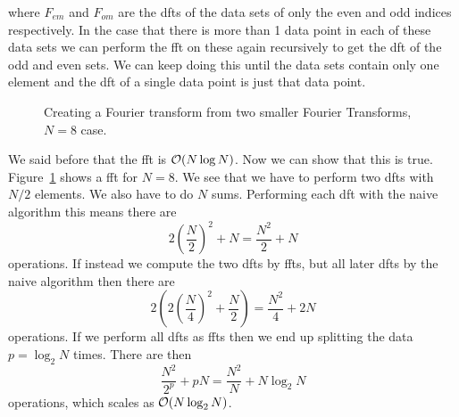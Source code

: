 \documentclass[a4paper]{article}
\begin{document}
    where \(F_{em}\) and \(F_{om}\) are the \glspl{dft} of the data sets of only the even and odd indices respectively.
    In the case that there is more than 1 data point in each of these data sets we can perform the \gls{fft} on these again recursively to get the \gls{dft} of the odd and even sets.
    We can keep doing this until the data sets contain only one element and the \gls{dft} of a single data point is just that data point.
    \begin{figure}[ht]
        \centering
        \caption{Creating a Fourier transform from two smaller Fourier Transforms, \(N = 8\) case.}
        \label{fig:fft example}
    \end{figure}
    We said before that the \gls{fft} is \(\order{N\log N}\).
    Now we can show that this is true.
    Figure~\ref{fig:fft example} shows a \gls{fft} for \(N = 8\).
    We see that we have to perform two \glspl{dft} with \(N/2\) elements.
    We also have to do \(N\) sums.
    Performing each \gls{dft} with the naive algorithm this means there are
    \[2\left(\frac{N}{2}\right)^2 + N = \frac{N^2}{2} + N\]
    operations.
    If instead we compute the two \glspl{dft} by \glspl{fft}, but all later \glspl{dft} by the naive algorithm then there are
    \[2\left(2\left(\frac{N}{4}\right)^2 + \frac{N}{2}\right) = \frac{N^2}{4} + 2N\]
    operations.
    If we perform all \glspl{dft} as \glspl{fft} then we end up splitting the data \(p = \log_2 N\) times.
    There are then
    \[\frac{N^2}{2^p} + pN = \frac{N^2}{N} + N\log_2N\]
    operations, which scales as \(\order{N\log_2 N}\).
    
\end{document}
